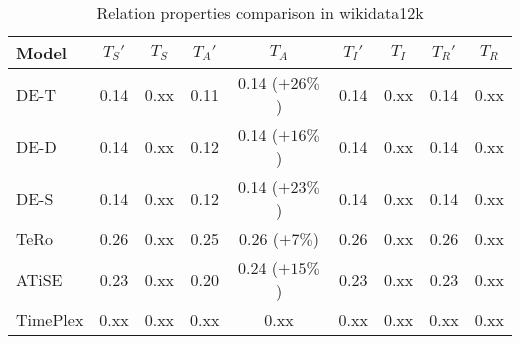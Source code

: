\begin{table*}[htb]
\centering
\begin{minipage}{0.95\textwidth}
\centering
\caption{Relation properties comparison in wikidata12k}
\vspace{-3mm}

\begin{tabular}{l|cc|cc|cc|cc}\hline
Model       & $T_S'$ & $T_S$ & $T_A'$ & $T_A$ & $T_I'$ & $T_I$ & $T_R'$ & $T_R$ \\ \hline
DE-T & 0.14 & 0.xx & 0.11 & 0.14 (\textcolor{textgreen}{$+26\%$}) & 0.14 & 0.xx & 0.14 & 0.xx \\ 
DE-D & 0.14 & 0.xx & 0.12 & 0.14 (\textcolor{textgreen}{$+16\%$}) & 0.14 & 0.xx & 0.14 & 0.xx \\ 
DE-S & 0.14 & 0.xx & 0.12 & 0.14 (\textcolor{textgreen}{$+23\%$}) & 0.14 & 0.xx & 0.14 & 0.xx \\ 
TeRo & 0.26 & 0.xx & 0.25 & 0.26 (\textcolor{textgreen}{$+7\%$}) & 0.26 & 0.xx & 0.26 & 0.xx \\ 
ATiSE & 0.23 & 0.xx & 0.20 & 0.24 (\textcolor{textgreen}{$+15\%$}) & 0.23 & 0.xx & 0.23 & 0.xx \\ 
TimePlex & 0.xx & 0.xx & 0.xx & 0.xx & 0.xx & 0.xx & 0.xx & 0.xx \\ 
 \hline
\end{tabular}

\label{fig:relation_properties_wikidata12k_comparison}
\end{minipage}
\end{table*}

